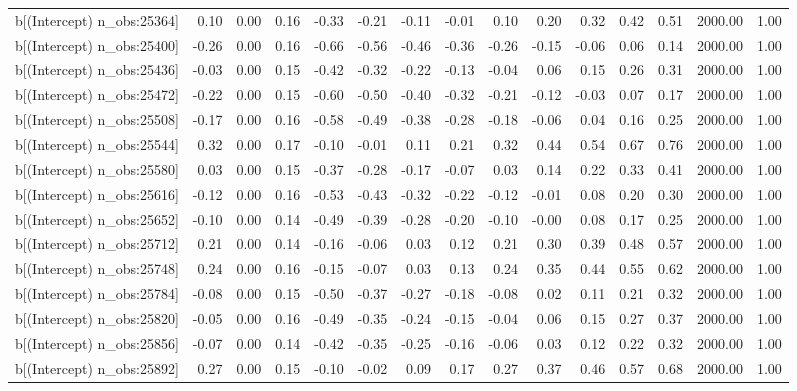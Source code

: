 \begin{table}[ht]
\begin{tabular}{rrrrrrrrrrrrrrr}
  b[(Intercept) n\_obs:25364] & 0.10 & 0.00 & 0.16 & -0.33 & -0.21 & -0.11 & -0.01 & 0.10 & 0.20 & 0.32 & 0.42 & 0.51 & 2000.00 & 1.00 \\ 
  b[(Intercept) n\_obs:25400] & -0.26 & 0.00 & 0.16 & -0.66 & -0.56 & -0.46 & -0.36 & -0.26 & -0.15 & -0.06 & 0.06 & 0.14 & 2000.00 & 1.00 \\ 
  b[(Intercept) n\_obs:25436] & -0.03 & 0.00 & 0.15 & -0.42 & -0.32 & -0.22 & -0.13 & -0.04 & 0.06 & 0.15 & 0.26 & 0.31 & 2000.00 & 1.00 \\ 
  b[(Intercept) n\_obs:25472] & -0.22 & 0.00 & 0.15 & -0.60 & -0.50 & -0.40 & -0.32 & -0.21 & -0.12 & -0.03 & 0.07 & 0.17 & 2000.00 & 1.00 \\ 
  b[(Intercept) n\_obs:25508] & -0.17 & 0.00 & 0.16 & -0.58 & -0.49 & -0.38 & -0.28 & -0.18 & -0.06 & 0.04 & 0.16 & 0.25 & 2000.00 & 1.00 \\ 
  b[(Intercept) n\_obs:25544] & 0.32 & 0.00 & 0.17 & -0.10 & -0.01 & 0.11 & 0.21 & 0.32 & 0.44 & 0.54 & 0.67 & 0.76 & 2000.00 & 1.00 \\ 
  b[(Intercept) n\_obs:25580] & 0.03 & 0.00 & 0.15 & -0.37 & -0.28 & -0.17 & -0.07 & 0.03 & 0.14 & 0.22 & 0.33 & 0.41 & 2000.00 & 1.00 \\ 
  b[(Intercept) n\_obs:25616] & -0.12 & 0.00 & 0.16 & -0.53 & -0.43 & -0.32 & -0.22 & -0.12 & -0.01 & 0.08 & 0.20 & 0.30 & 2000.00 & 1.00 \\ 
  b[(Intercept) n\_obs:25652] & -0.10 & 0.00 & 0.14 & -0.49 & -0.39 & -0.28 & -0.20 & -0.10 & -0.00 & 0.08 & 0.17 & 0.25 & 2000.00 & 1.00 \\ 
  b[(Intercept) n\_obs:25712] & 0.21 & 0.00 & 0.14 & -0.16 & -0.06 & 0.03 & 0.12 & 0.21 & 0.30 & 0.39 & 0.48 & 0.57 & 2000.00 & 1.00 \\ 
  b[(Intercept) n\_obs:25748] & 0.24 & 0.00 & 0.16 & -0.15 & -0.07 & 0.03 & 0.13 & 0.24 & 0.35 & 0.44 & 0.55 & 0.62 & 2000.00 & 1.00 \\ 
  b[(Intercept) n\_obs:25784] & -0.08 & 0.00 & 0.15 & -0.50 & -0.37 & -0.27 & -0.18 & -0.08 & 0.02 & 0.11 & 0.21 & 0.32 & 2000.00 & 1.00 \\ 
  b[(Intercept) n\_obs:25820] & -0.05 & 0.00 & 0.16 & -0.49 & -0.35 & -0.24 & -0.15 & -0.04 & 0.06 & 0.15 & 0.27 & 0.37 & 2000.00 & 1.00 \\ 
  b[(Intercept) n\_obs:25856] & -0.07 & 0.00 & 0.14 & -0.42 & -0.35 & -0.25 & -0.16 & -0.06 & 0.03 & 0.12 & 0.22 & 0.32 & 2000.00 & 1.00 \\ 
  b[(Intercept) n\_obs:25892] & 0.27 & 0.00 & 0.15 & -0.10 & -0.02 & 0.09 & 0.17 & 0.27 & 0.37 & 0.46 & 0.57 & 0.68 & 2000.00 & 1.00 \\ 

\end{tabular}
\end{table}

